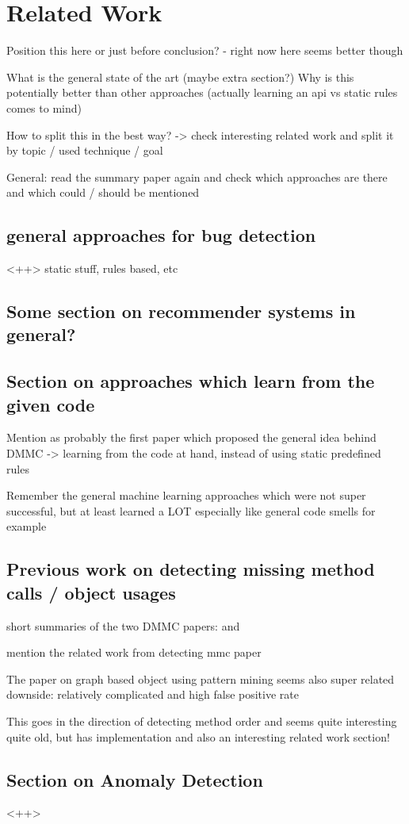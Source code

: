 \chapter{Related Work}

Position this here or just before conclusion? - right now here seems better though

What is the general state of the art (maybe extra section?)
Why is this potentially better than other approaches (actually learning an api vs static rules comes to mind)

How to split this in the best way?
-> check interesting related work and split it by topic / used technique / goal

General: read the summary paper \cite{robillard2013automated} again and check which approaches are there and which could / should be mentioned

\section{general approaches for bug detection}<++>
static stuff, rules based, etc

\section{Some section on recommender systems in general?}

\section{Section on approaches which learn from the given code}
Mention \cite{engler2001bugs} as probably the first paper which proposed the general idea behind DMMC -> learning from the code at hand, instead of using static predefined rules

Remember the general machine learning approaches which were not super successful, but at least learned a LOT
especially like general code smells for example

\section{Previous work on detecting missing method calls / object usages}
short summaries of the two DMMC papers: \cite{monperrus2010detecting} and \cite{monperrus2013detecting}

mention the related work from detecting mmc paper

The paper on graph based object using pattern mining seems also super related \cite{nguyen2009graph}
downside: relatively complicated and high false positive rate

This \cite{wasylkowski2007detecting} goes in the direction of detecting method order and seems quite interesting
quite old, but has implementation and also an interesting related work section!

\section{Section on Anomaly Detection}<++>
